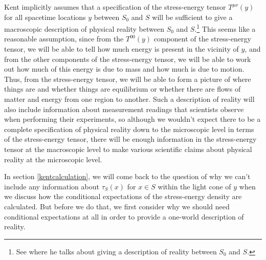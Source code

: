 Kent implicitly assumes that a specification of the stress-energy tensor $T^{\mu\nu}(y)$ for all spacetime locations $y$ between $S_0$ and $S$ will be sufficient to give a macroscopic description of physical reality between $S_0$ and $S$.\footnote{See \cite[2]{Kent2014} where he talks about giving a description of reality between $S_0$ and $S$.} This seems like a reasonable assumption, since from the $T^{00}(y)$ component of the stress-energy tensor, we will be able to tell how much energy is present in the vicinity of $y$, and from the other components of the stress-energy tensor, we will be able to work out how much of this energy is due to mass and how much is due to motion. Thus, from the stress-energy tensor, we will be able to form a picture of where things are and whether things are equilibrium or whether there are flows of matter and energy from one region to another. Such a description of reality will also include information about measurement readings that scientists observe when performing their experiments, so although  we wouldn't expect there to be a complete specification of physical reality down to the microscopic level in terms of the stress-energy tensor, there will be enough information in the stress-energy tensor at the macroscopic level to make various scientific claims about physical reality at the microscopic level. 

In section \ref{kentcalculation}, we will come back to the question of why we can't include any information about $\tau_S(x)$ for $x\in S$ within the light cone of $y$ when we discuss how the conditional expectations of the stress-energy density are calculated. But before we do that, we first consider why we should need conditional expectations at all in order to provide a one-world description of reality.


